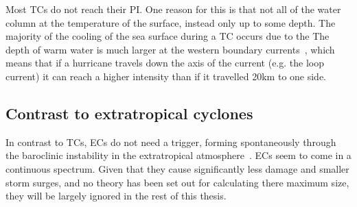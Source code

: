 



Most TCs do not reach their PI. One reason for this is that not all of the
water column at the temperature
of the surface, instead only up to some depth.
The majority of the cooling of
the sea surface during a TC occurs due to the
The depth of warm water
is much larger at the western boundary currents~\cite{hogg1995western},
which means that if a hurricane
travels down the axis of the current (e.g. the loop current)
it can reach a higher intensity than
if it travelled 20km to one side.


\subsection{Contrast to extratropical cyclones}
In contrast to TCs,  ECs do not need a trigger, forming
spontaneously through the baroclinic instability
in the extratropical atmosphere~\cite{lorenz1960energy}.
ECs seem to come in a continuous spectrum.
Given that they cause significantly less damage
and smaller storm surges, and no theory has been
 set out for calculating there maximum size,
they will be largely ignored in the rest of this thesis.
